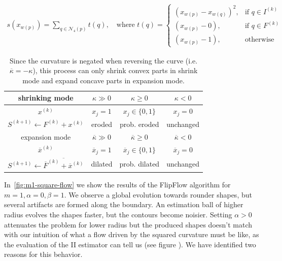 \begin{align}
  s(x_{w(p)})=\sum_{q \in \mathcal{N}_4(p)}{ t(q) }, \quad \text{where } t(q) = \left\{\begin{array}{ll}
  (x_{w(p)}-x_{w(q)})^2, & \text{if } q \in I^{(k)}\\
  (x_{w(p)}-0), & \text{if } q \in F^{(k)}\\
  (x_{w(p)}-1), & \text{otherwise }
  \end{array}\right.
  \label{eq:length-penalization}
\end{align}
	
\begin{table}
  \center
  \setlength{\extrarowheight}{0.75em}
  \begin{tabular}{|c|c|c|c|} \hline
    shrinking mode &    $\kappa \gg 0$ & $\kappa \geq 0$ &  $\kappa < 0$ \\ \hline
    $x^{(k)}$ & $x_j=1$ & $x_j \in \{0,1\}$ & $x_j=0$ \\ \hline
    $S^{(k+1)} \leftarrow F^{(k)} + x^{(k)}$ & eroded & prob. eroded & unchanged  \\ \hline \hline
    expansion mode &    $\overline{\kappa} \gg 0$ & $\overline{\kappa} \geq 0$ & $\overline{\kappa} < 0$ \\ \hline
    $\overline{x}^{(k)}$ & $\overline{x}_j=1$ & $\overline{x}_j \in \{0,1\}$ & $\overline{x}_j=0$ \\ \hline
    $S^{(k+1)} \leftarrow \overline{\overline{F}^{(k)} + \overline{x}^{(k)}}$ & dilated & prob. dilated & unchanged \\ \hline 
  \end{tabular}
  
  \caption{  Since the curvature is negated when reversing the curve (i.e. $\overline{\kappa}=-\kappa$), this process can only shrink  convex parts in shrink mode and expand concave parts in expansion mode.}
   \label{tab:flow-summary}	  

\end{table}


In~\cref{fig:m1-square-flow} we show the results of the FlipFlow algorithm for $m=1,\alpha=0, \beta=1$. We observe a global evolution towards rounder shapes, but several artifacts are formed along the boundary. An estimation ball of higher radius evolves the shapes faster, but the contours become noisier. Setting $\alpha >0$ attenuates the problem for lower radius but the produced shapes doesn't match with our intuition of what a flow driven by the squared curvature must be like, as the evaluation of the II estimator can tell us (see figure ). We have identified two reasons for this behavior.

